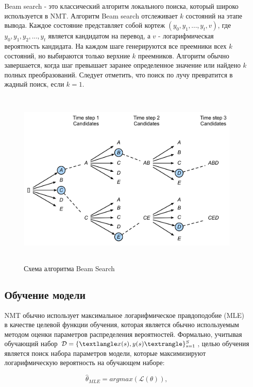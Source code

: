 	Beam search - это классический алгоритм локального поиска, который широко используется в NMT. Алгоритм Beam search отслеживает $k$ состояний на этапе вывода. Каждое состояние представляет собой кортеж $(y_0, y_1, ..., y_t, v)$, где $y_0, y_1, y_2, ..., y_t$ является кандидатом на перевод, а $v$ - логарифмическая вероятность кандидата. На каждом шаге генерируются все преемники всех $k$ состояний, но выбираются только верхние $k$ преемников. Алгоритм обычно завершается, когда шаг превышает заранее определенное значение или найдено $k$ полных преобразований. Следует отметить, что поиск по лучу превратится в жадный поиск, если $k = 1$.
	
	\begin{figure}[ht!]
		\centering
		\captionsetup{justification=centering}
		\includegraphics[height=90mm]{img/beam-search.png}
		\caption{Схема алгоритма Beam Search}
	\end{figure}
	
	
	\subsection{Обучение модели}
	
	NMT обычно использует максимальное логарифмическое правдоподобие (MLE) в качестве целевой функции обучения, которая является обычно используемым методом оценки параметров распределения вероятностей. Формально, учитывая обучающий набор $ \mathcal{D} = \{\textlangle x(s), y(s) \textrangle\}_{s=1}^S $, целью обучения является поиск набора параметров модели, которые максимизируют логарифмическую вероятность на обучающем наборе:
	
	$$
	    \hat{\theta}_{MLE} = argmax(\mathscr{L}(\theta)),
	$$

